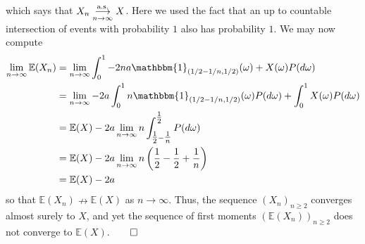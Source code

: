 \documentclass[10pt]{article}
\newcommand{\E}{\mathbb{E}}
\newcommand{\bp}[1]{\left({#1}\right)}
\newcommand{\1}[1]{\mathbbm{1}_{#1}}
\DeclareMathOperator{\as}{a.s.}
\begin{document}
    which says that $X_n\overunderset{\as}{n\rightarrow\infty}{\longrightarrow} X$. Here we used the fact that an up to countable intersection of events with probability $1$ also has probability $1$. We may now compute
    \begin{align*}
        \lim_{n\rightarrow\infty}\E(X_n)&=\lim_{n\rightarrow\infty}\int_0^1-2na\1{(1/2-1/n,1/2)}(\omega)+X(\omega)P(d\omega)\\
        &=\lim_{n\rightarrow\infty}-2a\int_{0}^1n\1{(1/2-1/n,1/2)}(\omega)P(d\omega)+\int_0^1X(\omega)P(d\omega)\\
        &=\E(X)-2a\lim_{n\rightarrow\infty}n\int_{\tfrac{1}{2}-\tfrac{1}{n}}^{\tfrac{1}{2}}P(d\omega)\\
        &=\E(X)-2a\lim_{n\rightarrow\infty}n\bp{\frac{1}{2}-\frac{1}{2}+\frac{1}{n}}\\
        &=\E(X)-2a
    \end{align*}
    so that $\E(X_n)\nrightarrow\E(X)$ as $n\rightarrow\infty$. Thus, the sequence $(X_n)_{n\geq 2}$ converges almost surely to $X$, and yet the sequence of first moments $(\E(X_n))_{n\geq 2}$ does not converge to $\E(X)$.\hfill{$\qed$}\\[5pt]
\end{document}
